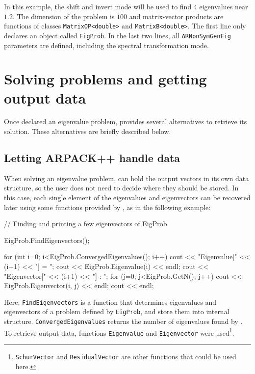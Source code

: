 In this example, the shift and invert mode will be used to find $4$ eigenvalues near $1.2$. The dimension of the problem is $100$ and matrix-vector products are functions of classes \texttt{MatrixOP<double>} and \texttt{MatrixB<double>}. The first line only declares an object called \texttt{EigProb}. In the last two lines, all \texttt{ARNonSymGenEig} parameters are defined, including the spectral transformation mode.

\section{Solving problems and getting output data}

Once declared an eigenvalue problem, \ARPP{} provides several alternatives to retrieve its solution. These alternatives are briefly described below.

\subsection{Letting ARPACK++ handle data}

When solving an eigenvalue problem, \ARPP{} can hold the output vectors in its own data structure, so the user does not need to decide where they should be stored. In this case, each single element of the eigenvalues and eigenvectors can be recovered later using some functions provided by \ARPP{}, as in the following example:

\begin{cppcode}
// Finding and printing a few eigenvectors of EigProb.
	
EigProb.FindEigenvectors();
	
for (int i=0; i<EigProb.ConvergedEigenvalues(); i++) {
	cout << "Eigenvalue[" << (i+1) << "] = ";
	cout << EigProb.Eigenvalue(i) << endl;
	cout << "Eigenvector[" << (i+1) << "] : ";
	for (j=0; j<EigProb.GetN(); j++) {
		cout << EigProb.Eigenvector(i, j) << endl;
	}
	cout << endl;
}
\end{cppcode}

Here, \texttt{FindEigenvectors} is a function that determines eigenvalues and eigenvectors of a problem defined by \texttt{EigProb}, and store them into \ARPP{} internal structure. \texttt{ConvergedEigenvalues} returns the number of eigenvalues found by \ARPP{}. To retrieve output data, functions \texttt{Eigenvalue} and \texttt{Eigenvector} were used\footnote{\texttt{SchurVector} and \texttt{ResidualVector} are other functions that could be used here.}.

